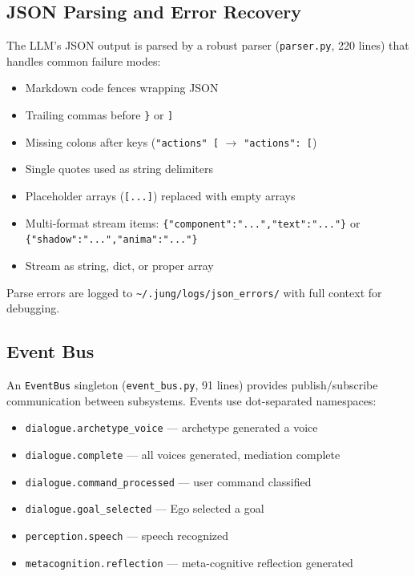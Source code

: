 \documentclass[11pt,oneside]{article}
\begin{document}
\subsection{JSON Parsing and Error Recovery}

The LLM's JSON output is parsed by a robust parser (\texttt{parser.py}, 220 lines) that handles common failure modes:

\begin{itemize}
  \item Markdown code fences wrapping JSON
  \item Trailing commas before \texttt{\}} or \texttt{]}
  \item Missing colons after keys (\texttt{"actions" [} $\to$ \texttt{"actions": [})
  \item Single quotes used as string delimiters
  \item Placeholder arrays (\texttt{[...]}) replaced with empty arrays
  \item Multi-format stream items: \texttt{\{"component":"...","text":"..."\}} or \texttt{\{"shadow":"...","anima":"..."\}}
  \item Stream as string, dict, or proper array
\end{itemize}

Parse errors are logged to \texttt{\~{}/.jung/logs/json\_errors/} with full context for debugging.

\subsection{Event Bus}

An \texttt{EventBus} singleton (\texttt{event\_bus.py}, 91 lines) provides publish/subscribe communication between subsystems.
Events use dot-separated namespaces:

\begin{itemize}
  \item \texttt{dialogue.archetype\_voice} --- archetype generated a voice
  \item \texttt{dialogue.complete} --- all voices generated, mediation complete
  \item \texttt{dialogue.command\_processed} --- user command classified
  \item \texttt{dialogue.goal\_selected} --- Ego selected a goal
  \item \texttt{perception.speech} --- speech recognized
  \item \texttt{metacognition.reflection} --- meta-cognitive reflection generated
\end{itemize}
\end{document}
